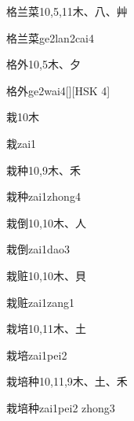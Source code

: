 \begin{entry}{格兰菜}{10,5,11}{⽊、⼋、⾋}
  \begin{phonetics}{格兰菜}{ge2lan2cai4}
  \end{phonetics}
\end{entry}

\begin{entry}{格外}{10,5}{⽊、⼣}
  \begin{phonetics}{格外}{ge2wai4}[][HSK 4]
  \end{phonetics}
\end{entry}

\begin{entry}{栽}{10}{⽊}
  \begin{phonetics}{栽}{zai1}
  \end{phonetics}
\end{entry}

\begin{entry}{栽种}{10,9}{⽊、⽲}
  \begin{phonetics}{栽种}{zai1zhong4}
  \end{phonetics}
\end{entry}

\begin{entry}{栽倒}{10,10}{⽊、⼈}
  \begin{phonetics}{栽倒}{zai1dao3}
  \end{phonetics}
\end{entry}

\begin{entry}{栽赃}{10,10}{⽊、⾙}
  \begin{phonetics}{栽赃}{zai1zang1}
  \end{phonetics}
\end{entry}

\begin{entry}{栽培}{10,11}{⽊、⼟}
  \begin{phonetics}{栽培}{zai1pei2}
  \end{phonetics}
\end{entry}

\begin{entry}{栽培种}{10,11,9}{⽊、⼟、⽲}
  \begin{phonetics}{栽培种}{zai1pei2 zhong3}
  \end{phonetics}
\end{entry}

